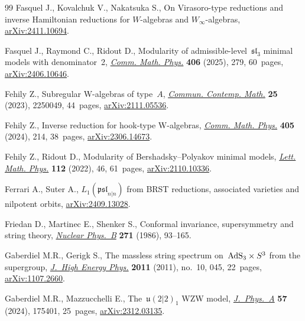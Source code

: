 \documentclass[10pt,a4paper]{amsart}
\numberwithin{equation}{section}
\begin{document}
\begin{thebibliography}{99}
Fasquel J., Kovalchuk V., Nakatsuka S., On {Virasoro}-type reductions and
 inverse {H}amiltonian reductions for {$W$}-algebras and
 {$W_{\infty}$}-algebras,
 \href{http://arxiv.org/abs/2411.10694}{arXiv:2411.10694}.

Fasquel J., Raymond C., Ridout D., Modularity of admissible-level~{$\mathfrak
 {sl}_3$} minimal models with denominator~2,
 \href{https://doi.org/10.1007/s00220-025-05447-7}{\textit{Comm. Math. Phys.}}
 \textbf{406} (2025), 279, 60~pages,
 \href{http://arxiv.org/abs/2406.10646}{arXiv:2406.10646}.

Fehily Z., Subregular {W}-algebras of type~{$A$},
 \href{https://doi.org/10.1142/S0219199722500493}{\textit{Commun. Contemp.
 Math.}} \textbf{25} (2023), 2250049, 44~pages,
 \href{http://arxiv.org/abs/2111.05536}{arXiv:2111.05536}.

Fehily Z., Inverse reduction for hook-type {W}-algebras,
 \href{https://doi.org/10.1007/s00220-024-05082-8}{\textit{Comm. Math. Phys.}}
 \textbf{405} (2024), 214, 38~pages,
 \href{http://arxiv.org/abs/2306.14673}{arXiv:2306.14673}.

Fehily Z., Ridout D., Modularity of {B}ershadsky--{P}olyakov minimal models,
 \href{https://doi.org/10.1007/s11005-022-01536-z}{\textit{Lett. Math. Phys.}}
 \textbf{112} (2022), 46, 61~pages,
 \href{http://arxiv.org/abs/2110.10336}{arXiv:2110.10336}.

Ferrari A., Suter A., {$L_1(\mathfrak{psl}_{n\vert n})$} from {BRST}
 reductions, associated varieties and nilpotent orbits,
 \href{http://arxiv.org/abs/2409.13028}{arXiv:2409.13028}.

Friedan D., Martinec E., Shenker S., Conformal invariance, supersymmetry and
 string theory,
 \href{https://doi.org/10.1016/0550-3213(86)90356-1}{\textit{Nuclear Phys.~B}}
 \textbf{271} (1986), 93--165.

Gaberdiel M.R., Gerigk S., The massless string spectrum on~{${\rm AdS}_3\times
 S^3$} from the supergroup,
 \href{https://doi.org/10.1007/jhep10(2011)045}{\textit{J.~High Energy Phys.}}
 \textbf{2011} (2011), no.~10, 045, 22~pages,
 \href{http://arxiv.org/abs/1107.2660}{arXiv:1107.2660}.

Gaberdiel M.R., Mazzucchelli E., The~{$\mathfrak u(2|2)_1$} {WZW} model,
 \href{https://doi.org/10.1088/1751-8121/ad3ab1}{\textit{J.~Phys.~A}}
 \textbf{57} (2024), 175401, 25~pages,
 \href{http://arxiv.org/abs/2312.03135}{arXiv:2312.03135}.


\end{thebibliography}
\end{document}
